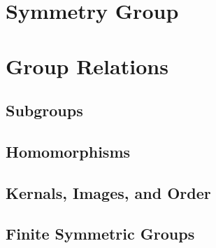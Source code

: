 \documentclass{report}
\begin{document}

\section{Symmetry Group}

\section{Group Relations}

\subsection{Subgroups}
\subsection{Homomorphisms}
\subsection{Kernals, Images, and Order}
\subsection{Finite Symmetric Groups}

\end{document}
